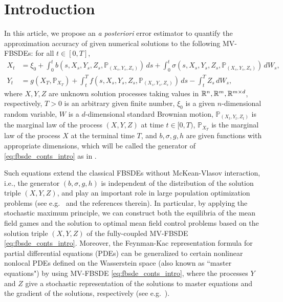 \documentclass[11pt]{article}
\numberwithin{equation}{section}
\theoremstyle{definition}
\theoremstyle{remark}
\newcommand{\q}{\quad}   \newcommand{\qq}{\qquad}
\def\l{\label}  \def\f{\frac}  \def\fa{\forall}
\def\sP{\mathbb{P}}
\def\sR{{\mathbb R}}
\begin{document}
\medskip
 










\section{Introduction}\l{sec:intro}
In this article, we 
propose an \textit{a posteriori} error estimator to quantify the approximation accuracy 
of  given numerical solutions to
the following 
  MV-FBSDEs:
for all $t\in [0,T]$,
\begin{subequations}\l{eq:fbsde_conts_intro}
\begin{align}
 X_t&=\xi_0+\int_0^t b(s,X_s,Y_s,Z_s,\sP_{(X_s,Y_s,Z_s)})\,ds  +
 \int_0^t \sigma (s,X_s,Y_s,Z_s,\sP_{(X_s,Y_s,Z_s)})\, d W_s, 
 \l{eq:fbsde_conts_fwd_intro}
\\
 Y_t&=g(X_T,\sP_{X_T})+\int_t^Tf(s,X_s,Y_s,Z_s,\sP_{(X_s,Y_s,Z_s)})\,ds-\int_t^TZ_s\,d W_s,
  \l{eq:fbsde_conts_bwd_intro}
\end{align}
\end{subequations}
where 
$X,Y,Z$ are unknown solution processes taking values in $\sR^n,\sR^m, \sR^{m\t d}$, respectively,
$T>0$ is an arbitrary given finite number, 
$\xi_0$ is a given $n$-dimensional  random variable, 
$W$ is a $d$-dimensional standard Brownian motion,
$\sP_{(X_t,Y_t,Z_t)}$ is the marginal law of the process $(X,Y,Z)$
at time $t\in [0,T)$, 
$\sP_{X_T}$  is the marginal law of the process $X$
at the terminal time $T$,
and
$b,\sigma, g,h$ are given functions with appropriate dimensions,
which will be called the generator of \eqref{eq:fbsde_conts_intro}
as in \cite{yong2010}.

Such equations extend the classical FBSDEs without McKean-Vlasov interaction,  
i.e., the generator $(b,\sigma, g,h)$ is independent of the distribution of the solution triple $(X,Y,Z)$,
and  play an important role in 
large population optimization problems
(see e.g.~\cite{peng1999,carmona2013,bensoussan2015,carmona2015} and the references therein).
In particular, by applying the stochastic maximum principle, we can  
construct 
both the  equilibria
 of  the mean field games
and the solution to optimal mean field control problems
based on the solution triple $(X,Y,Z)$
of the fully-coupled MV-FBSDE \eqref{eq:fbsde_conts_intro}.
Moreover, the  Feynman-Kac representation formula
 for  partial differential equations  (PDEs)
can be generalized 
to certain nonlinear nonlocal PDEs 
defined on 
 the Wasserstein space
 (also known as  ``master equations") 
by using MV-FBSDE \eqref{eq:fbsde_conts_intro},
where 
the processes $Y$ and $Z$
give a stochastic representation of
the solutions  to master equations
and the gradient of the solutions, respectively
(see e.g.~\cite{chassagneux2014,buckdahn2017,chassagneux2019}).
\end{document}
